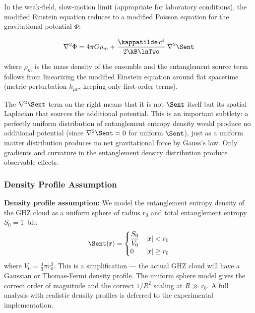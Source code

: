 In the weak-field, slow-motion limit (appropriate for laboratory
conditions), the modified Einstein equation reduces to a modified
Poisson equation for the gravitational potential $\Phi$:

\begin{equation}
    \nabla^2\Phi = 4\pi G\rho_m + \frac{\kappatilde\,c^4}
    {2\kB\lnTwo}\,\nabla^2\Sent
    \label{eq:modified_poisson}
\end{equation}

\noindent where $\rho_m$ is the mass density of the ensemble and the
entanglement source term follows from linearizing the modified Einstein
equation around flat spacetime (metric perturbation $h_{\mu\nu}$,
keeping only first-order terms).

The $\nabla^2\Sent$ term on the right means that it is not $\Sent$
itself but its spatial Laplacian that sources the additional potential.
This is an important subtlety: a perfectly uniform distribution of
entanglement entropy density would produce no additional potential
(since $\nabla^2\Sent = 0$ for uniform $\Sent$), just as a uniform
matter distribution produces no net gravitational force by Gauss's law.
Only gradients and curvature in the entanglement density distribution
produce observable effects.

\subsubsection{Density Profile Assumption}

\begin{framed}
\noindent\textbf{Density profile assumption:} We model the entanglement
entropy density of the GHZ cloud as a uniform sphere of radius
$r_0$ and total entanglement entropy $S_0 = 1$~bit:
\begin{equation}
    \Sent(\mathbf{r}) = \begin{cases}
        \dfrac{S_0}{V_0} & |\mathbf{r}| < r_0 \\
        0 & |\mathbf{r}| \geq r_0
    \end{cases}
    \label{eq:density_profile}
\end{equation}
where $V_0 = \frac{4}{3}\pi r_0^3$. This is a simplification --- the
actual GHZ cloud will have a Gaussian or Thomas-Fermi density profile.
The uniform sphere model gives the correct order of magnitude and the
correct $1/R^2$ scaling at $R \gg r_0$. A full analysis with realistic
density profiles is deferred to the experimental implementation.
\end{framed}

